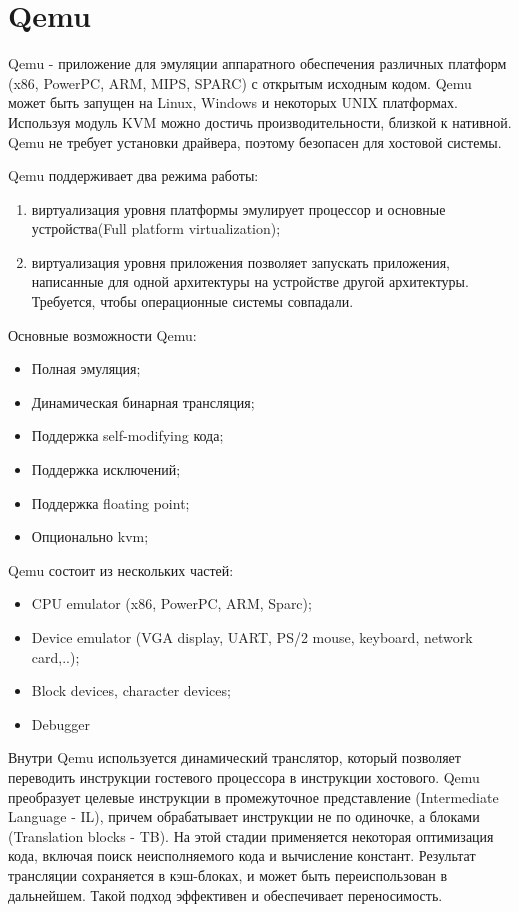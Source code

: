 \section{Qemu}
Qemu - приложение для эмуляции аппаратного обеспечения различных платформ (x86, PowerPC, ARM, MIPS, SPARC) с открытым исходным кодом. Qemu может быть запущен на Linux, Windows и некоторых UNIX платформах. Используя модуль KVM можно достичь производительности, близкой к нативной. Qemu не требует установки драйвера, поэтому безопасен для хостовой системы.

Qemu поддерживает два режима работы:

\begin{enumerate}
    \item виртуализация уровня платформы эмулирует процессор и основные устройства(Full platform virtualization);
    \item виртуализация уровня приложения позволяет запускать приложения, написанные для одной архитектуры на устройстве другой архитектуры. Требуется, чтобы операционные системы совпадали.
\end{enumerate}

Основные возможности Qemu:
\begin{itemize}
    \item Полная эмуляция;
    \item Динамическая бинарная трансляция;
    \item Поддержка self-modifying кода;
    \item Поддержка исключений;
    \item Поддержка floating point;
    \item Опционально kvm;
\end{itemize}

Qemu состоит из нескольких частей:
\begin{itemize}
    \item CPU emulator (x86, PowerPC, ARM, Sparc);
    \item Device emulator (VGA display, UART, PS/2 mouse, keyboard, network card,..);
    \item Block devices, character devices;
    \item Debugger
\end{itemize}

Внутри Qemu используется динамический транслятор, который позволяет переводить инструкции гостевого процессора в инструкции хостового. Qemu преобразует целевые инструкции в промежуточное представление (Intermediate Language - IL), причем обрабатывает инструкции не по одиночке, а блоками (Translation blocks - TB). На этой стадии применяется некоторая оптимизация кода, включая поиск неисполняемого кода и вычисление констант. Результат трансляции сохраняется в кэш-блоках, и может быть переиспользован в дальнейшем. Такой подход эффективен и обеспечивает переносимость.

